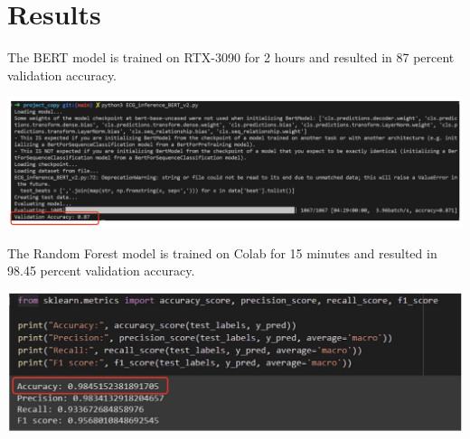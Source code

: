 \section{Results}
The BERT model is trained on RTX-3090 for 2 hours and resulted in 87 percent validation accuracy. 
\begin{center}
    \includegraphics[width=\textwidth]{latex-images/Sub-figures_Example/result1.jpg}
\end{center}
The Random Forest model is trained on Colab for 15 minutes and resulted in 98.45 percent validation accuracy. 
\begin{center}
    \includegraphics[width=\textwidth]{latex-images/Sub-figures_Example/result2.jpg}
\end{center}